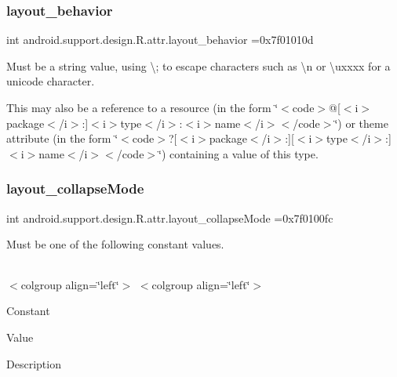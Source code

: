 \subsubsection{\texorpdfstring{layout\+\_\+behavior}{layout\_behavior}}
{\footnotesize\ttfamily int android.\+support.\+design.\+R.\+attr.\+layout\+\_\+behavior =0x7f01010d\hspace{0.3cm}{\ttfamily [static]}}

Must be a string value, using \textquotesingle{}\textbackslash{};\textquotesingle{} to escape characters such as \textquotesingle{}\textbackslash{}n\textquotesingle{} or \textquotesingle{}\textbackslash{}uxxxx\textquotesingle{} for a unicode character. 

This may also be a reference to a resource (in the form \char`\"{}$<$code$>$@\mbox{[}$<$i$>$package$<$/i$>$\+:\mbox{]}$<$i$>$type$<$/i$>$\+:$<$i$>$name$<$/i$>$$<$/code$>$\char`\"{}) or theme attribute (in the form \char`\"{}$<$code$>$?\mbox{[}$<$i$>$package$<$/i$>$\+:\mbox{]}\mbox{[}$<$i$>$type$<$/i$>$\+:\mbox{]}$<$i$>$name$<$/i$>$$<$/code$>$\char`\"{}) containing a value of this type. \mbox{\label{classandroid_1_1support_1_1design_1_1R_1_1attr_a7e6eee09bb81ae400b00405494ef8eba}} 
\subsubsection{\texorpdfstring{layout\+\_\+collapse\+Mode}{layout\_collapseMode}}
{\footnotesize\ttfamily int android.\+support.\+design.\+R.\+attr.\+layout\+\_\+collapse\+Mode =0x7f0100fc\hspace{0.3cm}{\ttfamily [static]}}

Must be one of the following constant values.

\tabulinesep=1mm
\begin{longtabu} spread 0pt [c]{*{0}{|X[-1]}|}
\hline
\end{longtabu}
$<$colgroup align=\char`\"{}left\char`\"{}$>$ $<$colgroup align=\char`\"{}left\char`\"{}$>$ 

Constant

Value

Description 

